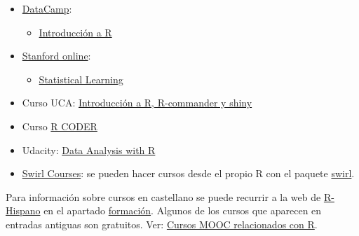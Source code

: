 \documentclass[
]{book}
\providecommand{\tightlist}{%
  \setlength{\itemsep}{0pt}\setlength{\parskip}{0pt}}
\begin{document}
\begin{itemize}
\item
  \href{https://www.datacamp.com/courses}{DataCamp}:

  \begin{itemize}
  \tightlist
  \item
    \href{https://www.datacamp.com/courses/introduccion-a-r/}{Introducción a R}
  \end{itemize}
\end{itemize}

\begin{itemize}
\item
  \href{http://online.stanford.edu/courses}{Stanford online}:

  \begin{itemize}
  \tightlist
  \item
    \href{http://online.stanford.edu/course/statistical-learning}{Statistical Learning}
  \end{itemize}
\end{itemize}

\begin{itemize}
\tightlist
\item
  Curso UCA: \href{http://knuth.uca.es/moodle/course/view.php?id=51}{Introducción a R, R-commander y shiny}
\end{itemize}

\begin{itemize}
\tightlist
\item
  Curso \href{https://r-coder.com/curso-r}{R CODER}
\end{itemize}

\begin{itemize}
\tightlist
\item
  Udacity: \href{https://eu.udacity.com/course/data-analysis-with-r--ud651}{Data Analysis with R}
\end{itemize}

\begin{itemize}
\tightlist
\item
  \href{https://swirlstats.com/scn/title.html}{Swirl Courses}:
  se pueden hacer cursos desde el propio R con el paquete
  \href{https://swirlstats.com}{swirl}.
\end{itemize}

Para información sobre cursos en castellano se puede recurrir a la web de \href{http://r-es.org/}{R-Hispano} en el apartado \href{http://r-es.org/category/formacion}{formación}. Algunos de los cursos que aparecen en entradas antiguas son gratuitos.
Ver: \href{http://r-es.org/2016/02/12/cursos-masivos-y-otra-formacion-on-line-sobre-r/}{Cursos MOOC relacionados con R}.
\end{document}

